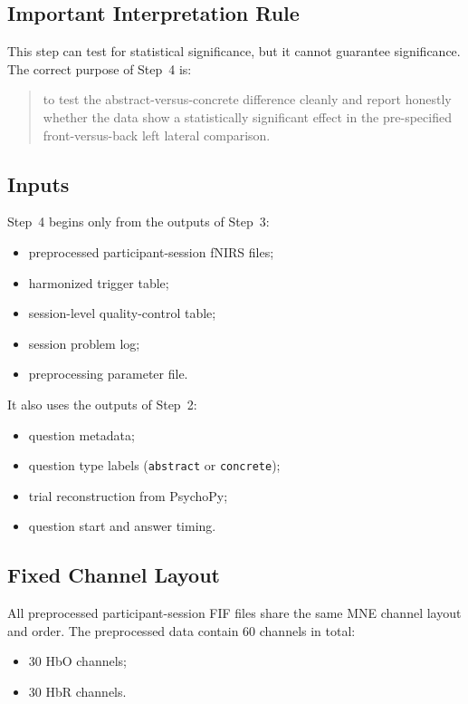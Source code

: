 \subsection{Important Interpretation Rule}
This step can test for statistical significance, but it cannot guarantee significance.
The correct purpose of Step~4 is:
\begin{quote}
to test the abstract-versus-concrete difference cleanly and report honestly whether the data show
a statistically significant effect in the pre-specified front-versus-back left lateral comparison.
\end{quote}

\subsection{Inputs}
Step~4 begins only from the outputs of Step~3:
\begin{itemize}
    \item preprocessed participant-session fNIRS files;
    \item harmonized trigger table;
    \item session-level quality-control table;
    \item session problem log;
    \item preprocessing parameter file.
\end{itemize}

It also uses the outputs of Step~2:
\begin{itemize}
    \item question metadata;
    \item question type labels (\texttt{abstract} or \texttt{concrete});
    \item trial reconstruction from PsychoPy;
    \item question start and answer timing.
\end{itemize}

\subsection{Fixed Channel Layout}
All preprocessed participant-session FIF files share the same MNE channel layout and order.
The preprocessed data contain 60 channels in total:
\begin{itemize}
    \item 30 HbO channels;
    \item 30 HbR channels.
\end{itemize}

